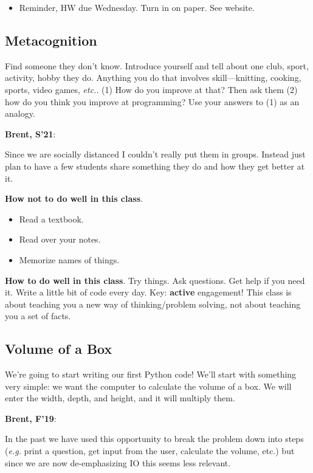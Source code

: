 \documentclass{article}
\newenvironment{reflect}[1]
{
  \noindent
  \begin{lrbox}{\reflectbox}
    \begin{minipage}[t]{\textwidth}
      \textbf{#1}:
}{
    \end{minipage}
  \end{lrbox}
  \fbox{\usebox{\reflectbox}}
}
\begin{document}
\begin{itemize}
\item Reminder, HW due Wednesday.  Turn in on paper.  See website.
\end{itemize}

\subsection*{Metacognition}

Find someone they don't know.  Introduce yourself and tell about one
club, sport, activity, hobby they do.  Anything you do that
involves skill---knitting, cooking, sports, video games, \emph{etc.}.
(1) How do you improve at that?  Then ask them (2) how do you think
you improve at programming? Use your answers to (1) as an analogy.

\begin{reflect}{Brent, S'21}
  Since we are socially distanced I couldn't really put them in
  groups.  Instead just plan to have a few students share something
  they do and how they get better at it.
\end{reflect}

\textbf{How not to do well in this class}.
\begin{itemize}
\item Read a textbook.
\item Read over your notes.
\item Memorize names of things.
\end{itemize}

\textbf{How to do well in this class}.  Try things.  Ask questions.
Get help if you need it.  Write a little bit of code every day.  Key:
\textbf{active} engagement!  This class is about teaching you a new
way of thinking/problem solving, not about teaching you a set of
facts.

\subsection*{Volume of a Box}

We're going to start writing our first Python code!  We'll start with
something very simple: we want the computer to calculate the volume of
a box.  We will enter the width, depth, and height, and it will
multiply them.

\begin{reflect}{Brent, F'19}
  In the past we have used this opportunity to break the problem down
  into steps (\emph{e.g.} print a question, get input from the user,
  calculate the volume, etc.) but since we are now de-emphasizing IO
  this seems less relevant.
\end{reflect}
\end{document}
